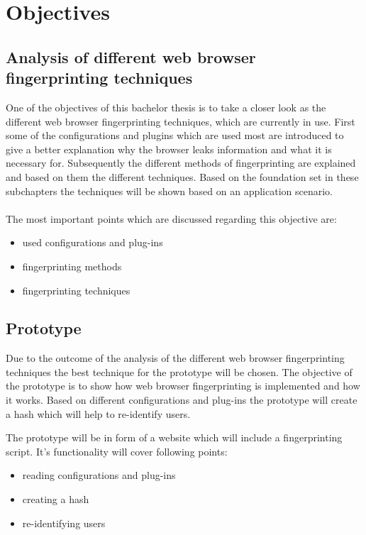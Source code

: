 \newpage
\section{Objectives}
\subsection{Analysis of different web browser fingerprinting techniques}
One of the objectives of this bachelor thesis is to take a closer look as the different web browser fingerprinting techniques, which are currently in use. 
First some of the configurations and plugins which are used most are introduced to give a better explanation why the browser leaks information and what it is necessary for. Subsequently the different methods of fingerprinting are explained and based on them the different techniques.
Based on the foundation set in these subchapters the techniques will be shown based on an application scenario. \\ 
\\
The most important points which are discussed regarding this objective are:
\begin{itemize}
	\item used configurations and plug-ins
	\item fingerprinting methods
	\item fingerprinting techniques
\end{itemize}

\subsection{Prototype}
Due to the outcome of the analysis of the different web browser fingerprinting techniques the best technique for the prototype will be chosen. The objective of the prototype is to show how web browser fingerprinting is implemented and how it works. Based on different configurations and plug-ins the prototype will create a hash which will help to re-identify users.

The prototype will be in form of a website which will include a fingerprinting script. It's functionality will cover following points:
\begin{itemize}
	\item reading configurations and plug-ins
	\item creating a hash
	\item re-identifying users
\end{itemize}

